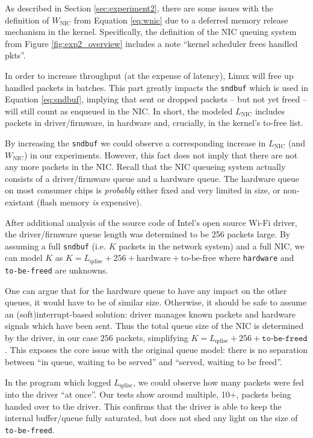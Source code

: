 As described in Section \ref{sec:experiment2}, there are some issues with the
definition of $W_\text{NIC}$ from Equation \ref{eq:wnic} due to a deferred
memory release mechanism in the kernel. Specifically, the definition of the
NIC queuing system from Figure \ref{fig:exp2_overview} includes a note
``kernel scheduler frees handled pkts''.

In order to increase throughput (at the expense of latency), Linux will free
up handled packets in batches. This part greatly impacts the \texttt{sndbuf}
which is used in Equation \ref{eq:sndbuf}, implying that sent or dropped
packets -- but not yet freed -- will still count as enqueued in the NIC. In
short, the modeled $L_\text{NIC}$ includes packets in driver/firmware, in
hardware and, crucially, in the kernel's to-free list.

By increasing the \texttt{sndbuf} we could observe a corresponding increase in
$L_\text{NIC}$ (and $W_\text{NIC}$) in our experiments. However, this fact
does not imply that there are not any more packets in the NIC. Recall that the
NIC queueing system actually consists of a driver/firmware queue and a
hardware queue. The hardware queue on most consumer chips is \emph{probably}
either fixed and very limited in size, or non-existant (flash memory \emph{is}
expensive).

After additional analysis of the source code of Intel's open source Wi-Fi
driver, the driver/firmware queue length was determined to be 256 packets
large. By assuming a full \texttt{sndbuf} (i.e. $K$ packets in the network
system) and a full NIC, we can model $K$ as $K = L_\text{qdisc} + 256 +
\text{hardware} + \text{to-be-free}$ where \texttt{hardware} and
\texttt{to-be-freed} are unknowns.

One can argue that for the hardware queue to have any impact on the other
queues, it would have to be of similar size. Otherwise, it should be safe to
assume an (soft)interrupt-based solution: driver manages known packets and
hardware signals which have been sent. Thus the total queue size of the NIC is
determined by the driver, in our case $256$ packets, simplifying $K =
L_\text{qdisc} + 256 + \texttt{to-be-freed}$. This exposes the core issue with
the original queue model: there is no separation between ``in queue, waiting
to be served'' and ``served, waiting to be freed''.

In the program which logged $L_\text{qdisc}$, we could observe how many
packets were fed into the driver ``at once''. Our tests show around multiple,
10+, packets being handed over to the driver. This confirms that the driver is
able to keep the internal buffer/queue fully saturated, but does not shed
any light on the size of \texttt{to-be-freed}.

